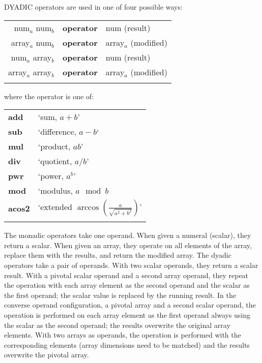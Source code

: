 
\noindent DYADIC operators are used in one of four possible ways:

\begin{tabular}{>{\sffamily}r>{\sffamily\bfseries}l>{\sffamily}l}
num$_a$ num$_b$ & operator & num (result)\\
array$_a$ num$_b$ & operator & array$_a$ (modified)\\
num$_a$ array$_b$ & operator & num (result)\\
array$_a$ array$_b$ & operator & array$_a$ (modified)\\\\
\end{tabular}

\noindent where the operator is one of:

\begin{tabular}{>{\sffamily\bfseries}l>{\normalfont}l}
add  & `sum, $a+b$'\\
sub  & `difference, $a-b$`\\
mul  & `product, $ab$'\\
div  & `quotient, $a/b$'\\
pwr  & `power, $a^b$'\\
mod  & `modulus, $a \mod{b}$\\
acos2  & `extended $\arccos(\frac{a}{\sqrt{a^2+b^2}})$'\\\\ 
\end{tabular}



The monadic operators take one operand. When given a numeral (scalar), they return a scalar. When given an array, they operate on all elements of the array, replace them with the results, and return the modified array. The dyadic operators take a pair of operands. With two scalar operands, they return a scalar result. With a pivotal scalar operand and a second array operand, they repeat the operation with each array element as the second operand and the scalar as the first operand; the scalar value is replaced by the running  result. In the converse operand configuration, a pivotal array and a second scalar operand, the operation is performed on each array element as the first operand always using the scalar as the second operand; the results overwrite the original array elements. With two arrays as operands, the operation is performed with the corresponding elements (array dimensions need to be matched) and the results overwrite the pivotal array.

